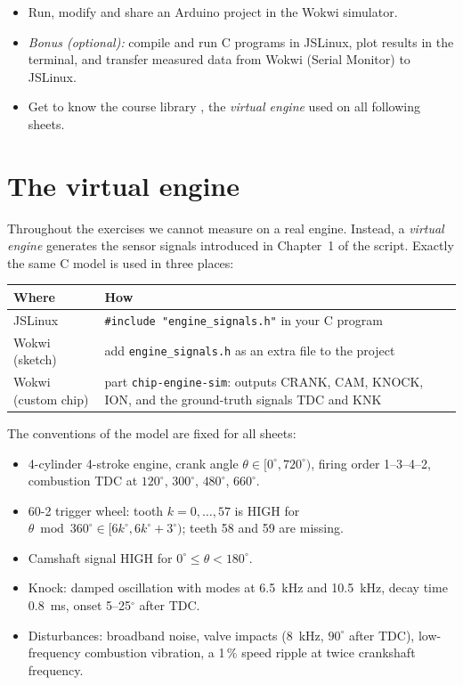 
\begin{goals}
\begin{itemize}
  \item Run, modify and share an Arduino project in the Wokwi simulator.
  \item \emph{Bonus (optional):} compile and run C programs in JSLinux, plot
    results in the terminal, and transfer measured data from Wokwi (Serial
    Monitor) to JSLinux.
  \item Get to know the course library , the
    \emph{virtual engine} used on all following sheets.
\end{itemize}
\end{goals}

\section*{The virtual engine}

Throughout the exercises we cannot measure on a real engine. Instead, a
\emph{virtual engine} generates the sensor signals introduced in Chapter~1 of
the script. Exactly the same C model is used in three places:

\begin{center}
\small
\begin{tabularx}{\textwidth}{@{}lX@{}}
\toprule
Where & How \\
\midrule
JSLinux & \verb|#include "engine_signals.h"| in your C program \\
Wokwi (sketch) & add \texttt{engine\_signals.h} as an extra file to the project \\
Wokwi (custom chip) & part \texttt{chip-engine-sim}: outputs CRANK, CAM, KNOCK, ION, and
  the ground-truth signals TDC and KNK \\
\bottomrule
\end{tabularx}
\end{center}

The conventions of the model are fixed for all sheets:
\begin{itemize}
  \item 4-cylinder 4-stroke engine, crank angle $\theta\in[0^\circ,720^\circ)$,
    firing order 1--3--4--2, combustion TDC at $120^\circ$, $300^\circ$,
    $480^\circ$, $660^\circ$.
  \item 60-2 trigger wheel: tooth $k=0,\dots,57$ is HIGH for
    $\theta \bmod 360^\circ\in[6k^\circ,6k^\circ+3^\circ)$; teeth 58 and 59 are missing.
  \item Camshaft signal HIGH for $0^\circ\le\theta<180^\circ$.
  \item Knock: damped oscillation with modes at \SI{6.5}{kHz} and
    \SI{10.5}{kHz}, decay time \SI{0.8}{ms}, onset 5--25$^\circ$ after TDC.
  \item Disturbances: broadband noise, valve impacts (\SI{8}{kHz},
    $90^\circ$ after TDC), low-frequency combustion vibration, a
    1\,\% speed ripple at twice crankshaft frequency.
\end{itemize}


